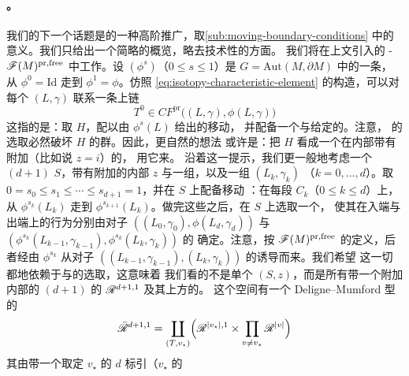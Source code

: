 \paragraph{\trHamiltonian\trIsotopy。}\label{sub:hamiltonian-isotopies}
我们的下一个话题是\trContinuationMap{}的一种高阶推广，取\cref{sub:moving-boundary-conditions}
中的意义。我们只给出一个简略的概览，略去技术性的方面。
我们将在上文引入的 \trAinfty-\trCategory{} $\mathscr{F}(M)^{\mathrm{pr,free}}$ 中工作。设
$(\phi^s)$（$0\le s\le 1$）是 $G=\mathrm{Aut}(M,\partial M)$ 中的一条\trIsotopy，%
从 $\phi^0=\mathrm{Id}$ 走到 $\phi^1=\phi$。仿照
\eqref{eq:isotopy-characteristic-element} 的构造，可以对每个 $(L,\gamma)$ 联系一条上链
\begin{equation*}
T^0\in CF^{\mathrm{pr}}\bigl((L,\gamma),\phi(L,\gamma)\bigr)
\end{equation*}
这指的是：取\trUpperHalfPlane{} $H$，配以由\trIsotopy{} $\phi^s(L)$ 给出的移动\trLagrange\trBoundaryCondition，%
并配备一个与给定\trFloerDatum{}\trCompatible{}的\trPerturbationDatum。注意，%
\trPerturbationDatum{}的选取必然破坏 $H$ 的\trHolomorphic\trAutomorphism{}群。因此，更自然的想法%
或许是：把 $H$ 看成一个在内部带有附加\trMarkedPoint{}（比如说 $z=i$）的\trSurface，%
用它来\trStabilization{}。
沿着这一提示，我们更一般地考虑一个 $(d{+}1)$ \trPointedDisc{} $S$，带有附加的内部%
\trMarkedPoint{} $z$ 与一组\trStriplikeEnd，以及一组\trObject{} $(L_k,\gamma_k)$
（$k=0,\ldots,d$）。取 $0=s_0\le s_1\le\cdots\le s_{d+1}=1$，并在 $S$ 上配备移动%
\trBoundaryCondition：在每段 $C_k$（$0\le k\le d$）上，从 $\phi^{s_k}(L_k)$
走到 $\phi^{s_{k+1}}(L_k)$。做完这些之后，在 $S$ 上选取一个\trPerturbationDatum，%
使其在入端与出端\trStriplikeEnd{}上的行为分别由对子
$((L_0,\gamma_0),\phi(L_d,\gamma_d))$ 与
$(\phi^{s_k}(L_{k-1},\gamma_{k-1}),\phi^{s_k}(L_k,\gamma_k))$ 的\trFloerDatum{}
确定。注意，按 $\mathscr{F}(M)^{\mathrm{pr,free}}$ 的定义，后者经由 $\phi^{s_k}$
从对子 $((L_{k-1},\gamma_{k-1}),(L_k,\gamma_k))$ 的\trFloerDatum{}诱导而来。我们希望%
这一切都\trSmooth{}地依赖于\trComplexStructure{}与\trMarkedPoint{}的选取，这意味着%
我们看的不是单个 $(S,z)$，而是所有带一个附加内部\trMarkedPoint{}的 $(d{+}1)$
\trPointedDisc{}的\trModuliSpace{} $\mathscr{R}^{d+1,1}$ 及其上方的\trUniversal\trFamily。%
这个空间有一个 Deligne--Mumford 型的\trCompactification
\begin{equation}\label{eq:moduli-with-interior-point}
\bar{\mathscr{R}}^{d+1,1}=\coprod_{(T,v_\star)}
\Bigl(\mathscr{R}^{|v_\star|,1}\times\prod_{v\neq v_\star}\mathscr{R}^{|v|}\Bigr)
\end{equation}
其\trStratum{}由带一个取定\trVertex{} $v_\star$ 的 $d$ \trLeafedTree{}标引（$v_\star$ 的%

